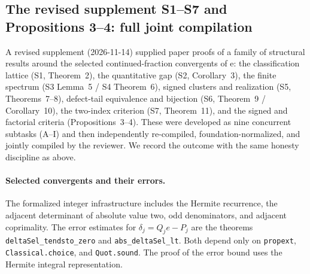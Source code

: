 \documentclass[11pt]{amsart}
\theoremstyle{definition}
\theoremstyle{remark}
\numberwithin{equation}{section}
\newcommand{\ee}{\mathrm{e}}
\begin{document}
\subsection{The revised supplement S1--S7 and Propositions 3--4: full joint compilation}\label{sec:lean-m6}

A revised supplement (2026-11-14) supplied paper proofs of a family of structural results around the selected continued-fraction convergents of $\ee$: the classification lattice (S1, Theorem~2), the quantitative gap (S2, Corollary~3), the finite spectrum (S3 Lemma~5 / S4 Theorem~6), signed clusters and realization (S5, Theorems~7--8), defect-tail equivalence and bijection (S6, Theorem~9 / Corollary~10), the two-index criterion (S7, Theorem~11), and the signed and factorial criteria (Propositions~3--4). These were developed as nine concurrent subtasks (A--I) and then independently re-compiled, foundation-normalized, and jointly compiled by the reviewer. We record the outcome with the same honesty discipline as above.

\paragraph{Selected convergents and their errors.}
The formalized integer infrastructure includes the Hermite recurrence,
the adjacent determinant of absolute value two, odd denominators, and
adjacent coprimality. The error estimates for
$\delta_j=Q_j e-P_j$ are the theorems \texttt{deltaSel\_tendsto\_zero}
and \texttt{abs\_deltaSel\_lt}. Both depend only on
\texttt{propext}, \texttt{Classical.choice}, and \texttt{Quot.sound}.
The proof of the error bound uses the Hermite integral representation.
\end{document}
